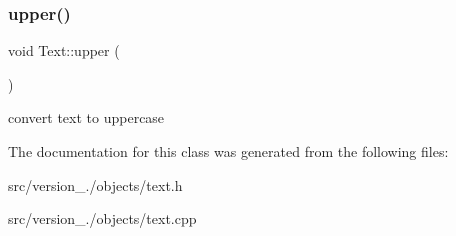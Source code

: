 \subsubsection{\texorpdfstring{upper()}{upper()}}
{\footnotesize\ttfamily void Text\+::upper (\begin{DoxyParamCaption}{ }\end{DoxyParamCaption})}

convert text to uppercase 

The documentation for this class was generated from the following files\+:\begin{DoxyCompactItemize}
\item 
src/version\+\_./objects/text.\+h\item 
src/version\+\_./objects/text.\+cpp\end{DoxyCompactItemize}

